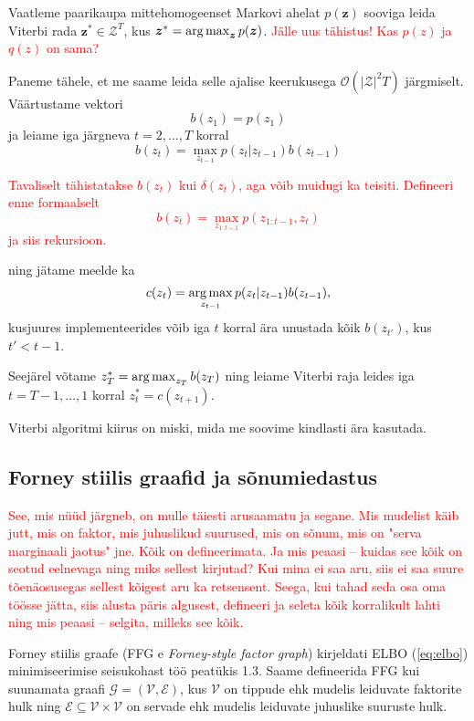 Vaatleme paarikaupa mittehomogeenset Markovi ahelat $p(\bm{z})$ sooviga leida Viterbi rada $\bm{z}^* \in \mathcal{Z}^T$, kus $\bm{z}^* = \operatorname*{arg\,max}_{\bm{z}} p(\bm{z})$. \textcolor{red}{Jälle uus tähistus! Kas $p(z)$ ja $q(z)$ on sama? }


Paneme tähele, et me saame leida selle ajalise keerukusega $\mathcal{O} (|\mathcal{Z}|^2 T)$ järgmiselt. Väärtustame vektori 
$$b(z_1) = p(z_1)$$
ja leiame iga järgneva $t = 2,\ldots,T$ korral 
$$b(z_t) = \max_{z_{t-1}} p(z_t | z_{t-1}) b(z_{t-1})$$

\textcolor{red}{Tavaliselt tähistatakse $b(z_t)$ kui $\delta(z_t)$, aga võib muidugi ka teisiti. Defineeri enne formaalselt
$$b(z_t)=\max_{z_{1:t-1}}p(z_{1:t-1},z_t)$$
ja siis rekursioon.}

ning jätame meelde ka
$$c(z_t) = \operatorname*{arg\,max}_{z_{t-1}} p(z_t | z_{t-1}) b(z_{t-1}),$$
kusjuures implementeerides võib iga $t$ korral ära unustada kõik $b(z_{t'})$, kus $t' < t - 1$.

Seejärel võtame $z_T^* = \operatorname*{arg\,max}_{z_{T}} b(z_T)$ ning leiame Viterbi raja leides iga $t = T-1,\ldots,1$ korral $z_t^* = c(z_{t+1})$.

Viterbi algoritmi kiirus on miski, mida me soovime kindlasti ära kasutada.

\subsection{Forney stiilis graafid ja sõnumiedastus}


\textcolor{red}{See, mis nüüd järgneb, on mulle täiesti arusaamatu ja segane. Mis mudelist käib jutt, mis on faktor, mis  juhuslikud suurused, mis on sõnum, mis on "serva marginaali jaotus" jne. Kõik on defineerimata. Ja mis peaasi -- kuidas see kõik on seotud eelnevaga ning miks sellest kirjutad?  Kui mina ei saa aru, siis ei saa suure tõenäosusegas sellest kõigest aru ka retsensent. Seega, kui tahad seda osa oma töösse jätta, siis alusta päris algusest, defineeri ja seleta kõik korralikult lahti ning mis peaasi -- selgita, milleks see kõik.}

Forney stiilis graafe (FFG e \emph{Forney-style factor graph}) kirjeldati ELBO (\ref{eq:elbo}) minimiseerimise seisukohast töö \cite{COX2019185} peatükis 1.3. Saame defineerida FFG kui suunamata graafi $\mathcal{G} = (\mathcal{V}, \mathcal{E})$, kus $\mathcal{V}$ on tippude ehk mudelis leiduvate faktorite hulk ning $\mathcal{E} \subseteq \mathcal{V} \times \mathcal{V}$ on servade ehk mudelis leiduvate juhuslike suuruste hulk.

